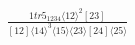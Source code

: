 \documentclass[varwidth, border=5pt]{standalone}
\begin{document}
\begin{my}
$\begin{gathered}
\scriptscriptstyle\frac{1tr5_{1234}⟨12⟩^2[23]}{[12]⟨14⟩^3⟨15⟩⟨23⟩[24]⟨25⟩}
\end{gathered}$
\end{my}
\end{document}
